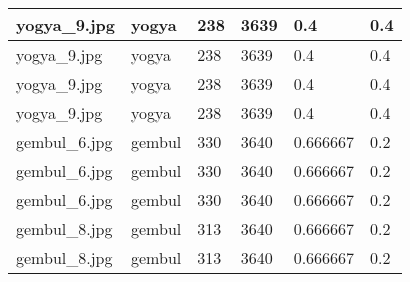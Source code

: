 \begin{table}[H]
\begin{tabular}{|l|l|l|l|l|l|}
		yogya\_9.jpg                       & yogya                                    & 238                                          & 3639                                         & 0.4                                      & 0.4                                       \\ \hline
		yogya\_9.jpg                       & yogya                                    & 238                                          & 3639                                         & 0.4                                      & 0.4                                       \\ \hline
		yogya\_9.jpg                       & yogya                                    & 238                                          & 3639                                         & 0.4                                      & 0.4                                       \\ \hline
		yogya\_9.jpg                       & yogya                                    & 238                                          & 3639                                         & 0.4                                      & 0.4                                       \\ \hline
		gembul\_6.jpg                      & gembul                                   & 330                                          & 3640                                         & 0.666667                                 & 0.2                                       \\ \hline
		gembul\_6.jpg                      & gembul                                   & 330                                          & 3640                                         & 0.666667                                 & 0.2                                       \\ \hline
		gembul\_6.jpg                      & gembul                                   & 330                                          & 3640                                         & 0.666667                                 & 0.2                                       \\ \hline
		gembul\_8.jpg                      & gembul                                   & 313                                          & 3640                                         & 0.666667                                 & 0.2                                       \\ \hline
		gembul\_8.jpg                      & gembul                                   & 313                                          & 3640                                         & 0.666667                                 & 0.2                                       \\ \hline

\end{tabular}
\end{table}
